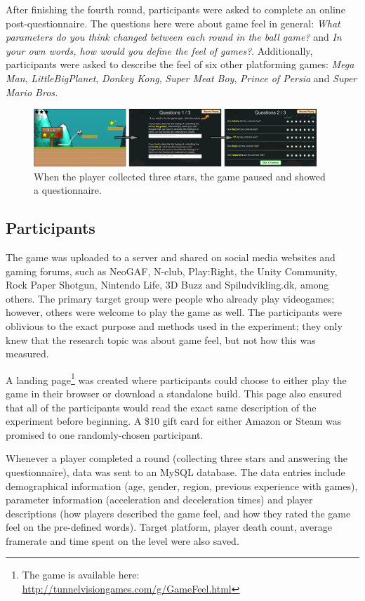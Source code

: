 After finishing the fourth round, participants were asked to complete an online post-questionnaire. The questions here were about game feel in general: \textit{What parameters do you think changed between each round in the ball game?} and \textit{In your own words, how would you define the feel of games?}. Additionally, participants were asked to describe the feel of six other platforming games: \textit{Mega Man}, \textit{LittleBigPlanet}, \textit{Donkey Kong}, \textit{Super Meat Boy}, \textit{Prince of Persia} and \textit{Super Mario Bros.}

\begin{figure}[htbp]
\centering
\includegraphics[width=0.95\textwidth]{Pics/game_phases}
\caption{When the player collected three stars, the game paused and showed a questionnaire.}
\label{fig:questionnaire}
\end{figure}

\subsection{Participants}
The game was uploaded to a server and shared on social media websites and gaming forums, such as NeoGAF, N-club, Play:Right, the Unity Community, Rock Paper Shotgun, Nintendo Life, 3D Buzz and Spiludvikling.dk, among others. The primary target group were people who already play videogames; however, others were welcome to play the game as well. The participants were oblivious to the exact purpose and methods used in the experiment; they only knew that the research topic was about game feel, but not how this was measured.

A landing page\footnote{The game is available here: \\ \url{http://tunnelvisiongames.com/g/GameFeel.html}} was created where participants could choose to either play the game in their browser or download a standalone build. This page also ensured that all of the participants would read the exact same description of the experiment before beginning. A \$10 gift card for either Amazon or Steam was promised to one randomly-chosen participant.

Whenever a player completed a round (collecting three stars and answering the questionnaire), data was  sent to an MySQL database. The data entries include demographical information (age, gender, region, previous experience with games), parameter information (acceleration and deceleration times) and player descriptions (how players described the game feel, and how they rated the game feel on the pre-defined words). Target platform, player death count, average framerate and time spent on the level were also saved.

